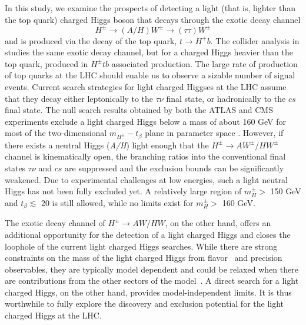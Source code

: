 In this study, we examine the prospects of detecting a light (that is, lighter than the top quark) charged Higgs boson that decays through the exotic decay channel
\[H^\pm\rightarrow (A/H)W^\pm\rightarrow (\tau\tau) W^\pm\]
and is produced via the decay of the top quark, $t\rightarrow H^+ b$.
The collider analysis in \cite{Coleppa:2014cca} studies the same exotic decay channel, but for a charged Higgs heavier than the top quark, produced in $H^\pm tb$ associated production.
The large rate of production of top quarks at the LHC should enable us to observe a sizable number of signal events. Current search strategies for light charged Higgses at the LHC assume that they decay either leptonically to the $\tau\nu$ final state, or hadronically to the $cs$ final state. The null search results obtained by both the ATLAS and CMS experiments exclude a light charged Higgs below a mass of about 160 GeV for most of the two-dimensional $m_{H^\pm}-t_{\beta}$ plane in parameter space \cite{TheATLAScollaboration:2013wia,CMS:2014cdp}. However, if there exists a neutral Higgs (\emph{A/H}) light enough that the $H^{\pm} \rightarrow AW^{\pm}/HW^{\pm}$ channel is kinematically open, the branching ratios into the conventional final states $\tau\nu$ and $cs$ are suppressed and the exclusion bounds can be significantly weakened. Due to experimental challenges at low energies, such a light neutral Higgs has not been fully excluded yet. A relatively large region of $m_H^\pm > $ 150 GeV and $t_\beta \lesssim$ 20 is still allowed, while no limits exist for $m_H^\pm > $ 160 GeV.

The exotic decay channel of $H^\pm \to AW/HW$, on the other hand,  offers an additional opportunity for the detection of a light charged Higgs and closes the loophole of the current light charged Higgs searches.  While there are strong constraints on the mass of the light charged Higgs from flavor~\cite{Mahmoudi:2009zx,Coleppa:2013dya} and precision~\cite{Froggatt:1991qw,Froggatt:1992wt,Pomarol:1993mu,WahabElKaffas:2007xd,Haber:2010bw} observables, they are typically model dependent and could be relaxed when there are contributions from the other sectors of the model~\cite{Han:2013mga}. A direct search for a light charged Higgs, on the other hand, provides model-independent limits. It is thus worthwhile to fully explore the discovery and exclusion potential for the light charged Higgs at the LHC.


